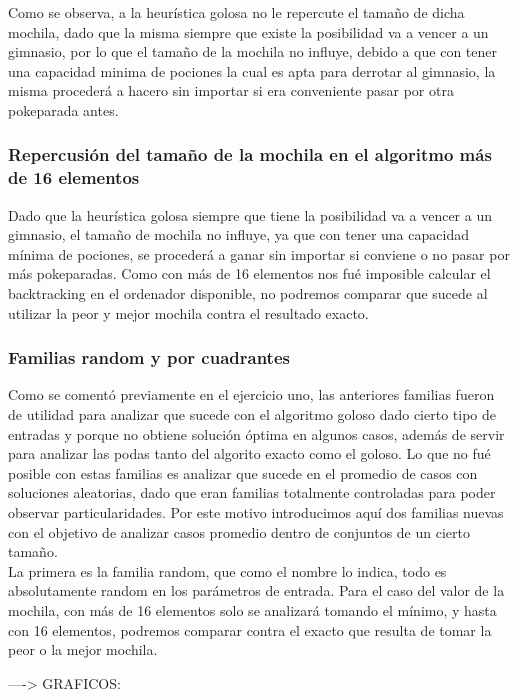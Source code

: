 Como se observa, a la heurística golosa no le repercute el tamaño de dicha mochila, dado que la misma siempre que existe la posibilidad va a vencer a un gimnasio, por lo que el tamaño de la mochila no influye, debido a que con tener una capacidad minima de pociones la cual es apta para derrotar al gimnasio, la misma proceder\'a a hacero sin importar si era conveniente pasar por otra pokeparada antes.

\subsubsection*{Repercusi\'on del tamaño de la mochila en el algoritmo más de 16 elementos}

Dado que la heur\'istica golosa siempre que tiene la posibilidad va a vencer a un gimnasio, el tamaño de mochila no influye, ya que con tener una capacidad m\'inima de pociones, se proceder\'a a ganar sin importar si conviene o no pasar por más pokeparadas. Como con más de 16 elementos nos fué imposible calcular el backtracking en el ordenador disponible, no podremos comparar que sucede al utilizar la peor y mejor mochila contra el resultado exacto.

\subsubsection*{Familias random y por cuadrantes}

Como se comentó previamente en el ejercicio uno, las anteriores familias fueron de utilidad para analizar que sucede con el algoritmo goloso dado cierto tipo de entradas y porque no obtiene solución óptima en algunos casos, además de servir para analizar las podas tanto del algorito exacto como el goloso. Lo que no fué posible con estas familias es analizar que sucede en el promedio de casos con soluciones aleatorias, dado que eran familias totalmente controladas para poder observar particularidades. Por este motivo introducimos aquí dos familias nuevas con el objetivo de analizar casos promedio dentro de conjuntos de un cierto tamaño.\\

La primera es la familia random, que como el nombre lo indica, todo es absolutamente random en los parámetros de entrada.
Para el caso del valor de la mochila, con más de 16 elementos solo se analizará tomando el mínimo, y hasta con 16 elementos, podremos comparar contra el exacto que resulta de tomar la peor o la mejor mochila.

----> GRAFICOS:

